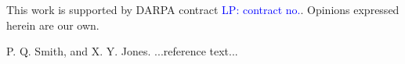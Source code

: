 \documentclass{sigplanconf}
\newcommand{\lp}[1]{\textcolor{blue}{LP: #1}}
\newcommand{\lp}[1]{}
\begin{document}
\acks

This work is supported by DARPA contract \lp{contract no.}.  Opinions
expressed herein are our own.





\begin{thebibliography}{}
\softraggedright

P. Q. Smith, and X. Y. Jones. ...reference text...

\end{thebibliography}
\end{document}
